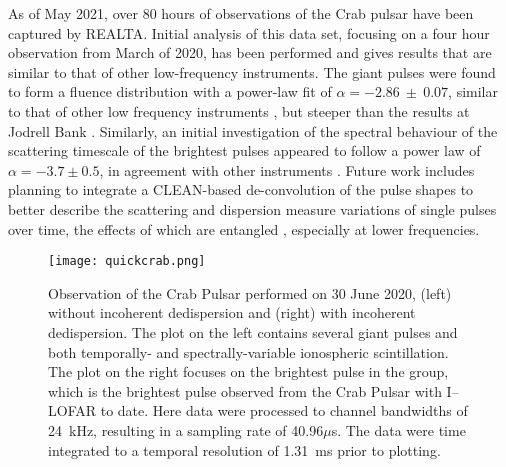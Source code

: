 As of May 2021, over 80 hours of observations of the Crab pulsar have been captured by REALTA. Initial analysis of this data set, focusing on a four hour observation from March of 2020, has been performed and gives results that are similar to that of other low-frequency instruments. The giant pulses were found to form a fluence distribution with a power-law fit of $\alpha = -2.86~\pm~0.07$, similar to that of other low frequency instruments \citep{Meyers2017}, but steeper than the results at Jodrell Bank \citep{Mickaliger2017}. Similarly, an initial investigation of the spectral behaviour of the scattering timescale of the brightest pulses appeared to follow a power law of $\alpha = -3.7 \pm 0.5$, in agreement with other instruments \citep{Driessen2019}. Future work includes planning to integrate a CLEAN-based de-convolution \citep[see][]{Bhat2003} of the pulse shapes to better describe the scattering and dispersion measure variations of single pulses over time, the effects of which are entangled \citep{McKee2018}, especially at lower frequencies.

\begin{figure}
    \centering
    \texttt{[image: quickcrab.png]}
    \caption[Observation of the Crab Pulsar performed on 30 June 2020.]{Observation of the Crab Pulsar performed on 30 June 2020, (left) without incoherent dedispersion and (right) with incoherent dedispersion. The plot on the left contains several giant pulses and both temporally- and spectrally-variable ionospheric scintillation.  The plot on the right focuses on the brightest pulse in the group, which is the brightest pulse observed from the Crab Pulsar with I--LOFAR to date. Here data were processed to channel bandwidths of 24~kHz, resulting in a sampling rate of 40.96$\mu$s. The data were time integrated to a temporal resolution of 1.31~ms prior to plotting.}
    \label{fig:giant_pulse}
\end{figure}

